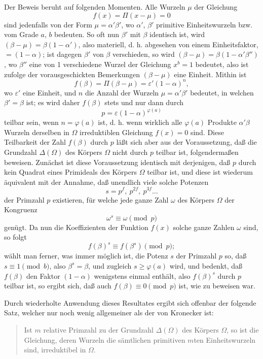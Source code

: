 \documentclass[11pt]{article}
\newcommand{\origpage}[1]{\par\vspace{0.25em}\noindent{\footnotesize\itshape [Gedruckte Seite #1]}\par\vspace{0.25em}}
\begin{document}
\origpage{413}
Der Beweis beruht auf folgenden Momenten. Alle Wurzeln $\mu$ der Gleichung
\[
 f(x)=\Pi(x-\mu)=0
\]
sind jedenfalls von der Form $\mu=\alpha'\beta'$, wo $\alpha'$, $\beta'$ primitive Einheitswurzeln bzw. vom Grade $a$, $b$ bedeuten. So oft nun $\beta'$ mit $\beta$ identisch ist, wird $(\beta-\mu)=\beta(1-\alpha')$, also materiell, d. h. abgesehen von einem Einheitsfaktor, $=(1-\alpha)$; ist dagegen $\beta'$ von $\beta$ verschieden, so wird $(\beta-\mu)=\beta(1-\alpha'\beta'')$, wo $\beta''$ eine von 1 verschiedene Wurzel der Gleichung $x^b=1$ bedeutet, also ist zufolge der vorausgeschickten Bemerkungen $(\beta-\mu)$ eine Einheit. Mithin ist
\[
 f(\beta)=\Pi(\beta-\mu)=\varepsilon'(1-\alpha)^n,
\]
wo $\varepsilon'$ eine Einheit, und $n$ die Anzahl der Wurzeln $\mu=\alpha'\beta'$ bedeutet, in welchen $\beta'=\beta$ ist; es wird daher $f(\beta)$ stets und nur dann durch
\[
 p=\varepsilon(1-\alpha)^{\varphi(a)}
\]
teilbar sein, wenn $n=\varphi(a)$ ist, d. h. wenn wirklich alle $\varphi(a)$ Produkte $\alpha'\beta$ Wurzeln derselben in $\Omega$ irreduktiblen Gleichung $f(x)=0$ sind. Diese Teilbarkeit der Zahl $f(\beta)$ durch $p$ läßt sich aber aus der Voraussetzung, daß die Grundzahl $\Delta(\Omega)$ des Körpers $\Omega$ nicht durch $p$ teilbar ist, folgendermaßen beweisen. Zunächst ist diese Voraussetzung identisch mit derjenigen, daß $p$ durch kein Quadrat eines Primideals des Körpers $\Omega$ teilbar ist, und diese ist wiederum äquivalent mit der Annahme, daß unendlich viele solche Potenzen
\[
 s=p^f,\ p^{2f},\ p^{3f}\ldots
\]
der Primzahl $p$ existieren, für welche jede ganze Zahl $\omega$ des Körpers $\Omega$ der Kongruenz
\[
 \omega^s\equiv \omega \pmod p
\]
genügt. Da nun die Koeffizienten der Funktion $f(x)$ solche ganze Zahlen $\omega$ sind, so folgt
\[
 f(\beta)^s\equiv f(\beta^s)\pmod p;
\]
wählt man ferner, was immer möglich ist, die Potenz $s$ der Primzahl $p$ so, daß $s\equiv 1\pmod b$, also $\beta^s=\beta$, und zugleich $s\geq \varphi(a)$ wird, und bedenkt, daß $f(\beta)$ den Faktor $(1-\alpha)$ wenigstens einmal enthält, also $f(\beta)^s$ durch $p$ teilbar ist, so ergibt sich, daß auch $f(\beta)\equiv0\pmod p$ ist, wie zu beweisen war.

Durch wiederholte Anwendung dieses Resultates ergibt sich offenbar der folgende Satz, welcher nur noch wenig allgemeiner als der von Kronecker ist:

\origpage{414}
\begin{quote}
Ist $m$ relative Primzahl zu der Grundzahl $\Delta(\Omega)$ des Körpers $\Omega$, so ist die Gleichung, deren Wurzeln die sämtlichen primitiven $m$ten Einheitswurzeln sind, irreduktibel in $\Omega$.
\end{quote}
\end{document}
